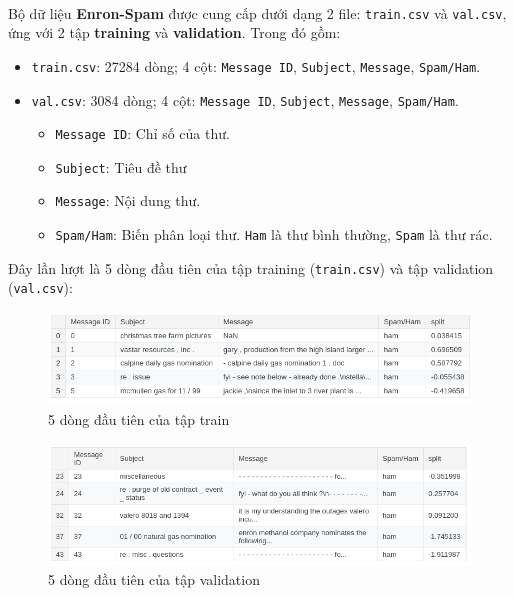 \paragraph{}{Bộ dữ liệu \textbf{Enron-Spam} được cung cấp dưới dạng 2 file: \texttt{train.csv} và \texttt{val.csv},  ứng với 2 tập \textbf{training} và \textbf{validation}. Trong đó gồm: 
\begin{itemize}
    \item \texttt{train.csv}: 27284 dòng; 4 cột: \texttt{Message ID}, \texttt{Subject}, \texttt{Message}, \texttt{Spam/Ham}.
    \item \texttt{val.csv}: 3084 dòng; 4 cột: \texttt{Message ID}, \texttt{Subject}, \texttt{Message}, \texttt{Spam/Ham}.
    \begin{itemize}
        \item \texttt{Message ID}: Chỉ số của thư.
        \item \texttt{Subject}: Tiêu đề thư
        \item \texttt{Message}: Nội dung thư.
        \item \texttt{Spam/Ham}: Biến phân loại thư. \texttt{Ham} là thư bình thường, \texttt{Spam} là thư rác.
    \end{itemize}
\end{itemize}

Đây lần lượt là 5 dòng đầu tiên của tập training (\texttt{train.csv}) và tập validation (\texttt{val.csv}):

\begin{figure}[H]
    \centering
    \includegraphics[width=1\linewidth]{img/05-dftrain-head.png}
    \caption{5 dòng đầu tiên của tập train}
\end{figure}

\begin{figure}[H]
    \centering
    \includegraphics[width=1\linewidth]{img/05-dfval-head.png}
    \caption{5 dòng đầu tiên của tập validation}
\end{figure}

}
